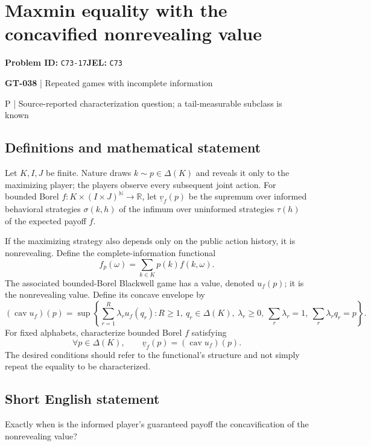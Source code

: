 \documentclass[11pt,a4paper]{article}
\begin{document}
\section*{Maxmin equality with the concavified nonrevealing value}
\textbf{Problem ID:} \texttt{C73-17}\quad \textbf{JEL:} \texttt{C73}\par
\label{problem:OP-0168}
\label{game:GT-038}
{\sffamily\small\color{muted}
{\sffamily\small\color{muted}\textbf{GT-038} | Repeated games with incomplete information\par P | Source-reported characterization question; a tail-measurable subclass is known\par}
\par}
\subsection*{Definitions and mathematical statement}
Let $K,I,J$ be finite. Nature draws $k\sim p\in\Delta(K)$ and reveals it only to the maximizing player; the players observe every subsequent joint action. For bounded Borel $f:K\times(I\times J)^{\mathbb N}\to\mathbb R$, let $\underline v_f(p)$ be the supremum over informed behavioral strategies $\sigma(k,h)$ of the infimum over uninformed strategies $\tau(h)$ of the expected payoff $f$.

If the maximizing strategy also depends only on the public action history, it is nonrevealing. Define the complete-information functional
\[
 f_p(\omega)=\sum_{k\in K}p(k)f(k,\omega).
\]
The associated bounded-Borel Blackwell game has a value, denoted $u_f(p)$; it is the nonrevealing value. Define its concave envelope by
\[
 (\operatorname{cav}u_f)(p)=
 \sup\left\{\sum_{r=1}^{R}\lambda_r u_f(q_r):
 R\geq1,\ q_r\in\Delta(K),\ \lambda_r\geq0,\ 
 \sum_r\lambda_r=1,\ \sum_r\lambda_rq_r=p\right\}.
\]
For fixed alphabets, characterize bounded Borel $f$ satisfying
\[
 \forall p\in\Delta(K),\qquad
 \underline v_f(p)=(\operatorname{cav}u_f)(p).
\]
The desired conditions should refer to the functional's structure and not simply repeat the equality to be characterized.
\subsection*{Short English statement}
Exactly when is the informed player's guaranteed payoff the concavification of the nonrevealing value?
\end{document}
